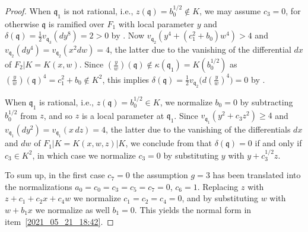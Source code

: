 \documentclass[12pt,reqno]{amsart}
\newcommand{\todoo}[2][]{\todo[size=tiny, #1]{#2}} %
\theoremstyle{definition}
\newcommand{\fq}{\mathfrak{q}}
\newcommand{\de}{\delta}
\newcommand{\ka}{\kappa}
\begin{document}
\begin{proof}
When $\fq_1$ is not rational, i.e., $z(\fq) = b_0^{1/2} \notin K$, 
we may assume $c_3 = 0$, for otherwise $\fq$ is ramified over $F_1$ with local parameter $y$ and $\de(\fq) = \frac12 v_{\fq_3}(dy^8) = 2 > 0$ by \cite[Theorem~2.3]{BedSt87}.
Now $v_{\fq_2}(y^4 + (c_1^2 + b_0) w^4)>4$ and $v_{\fq_2}(dy^4) = v_{\fq_2}(x^2 d w) = 4$, the latter due to the vanishing of the differential $dx$ of $F_2|K = K(x,w)$.
Since $(\frac{y}{w})(\fq)\notin \ka(\fq_1)=K(b_0^{1/2})$ as $(\frac{y}{w})(\fq)^4 = c_1^2 + b_0 \notin K^2$, 
this implies $\de(\fq) = \frac12 v_{\fq_2} \big( d(\frac yw)^4 \big) = 0$
by \cite[Theorem~2.3]{BedSt87}.


When $\fq_1$ is rational, i.e., $z(\fq)=b_0^{1/2} \in K$, we normalize $b_0 = 0$ by subtracting $b_0^{1/2}$ from $z$, and so $z$ is a local parameter at $\fq_1$. 
Since $v_{\fq_1}(y^2 + c_3 z^2) \geq 4$ and $v_{\fq_1}(dy^2) = v_{\fq_1}(x \, d z)=4$, the latter due to the vanishing of the differentials $dx$ and $dw$ of $F_1|K=K(x,w,z)|K$,
we conclude from \cite[Proposition~4.1]{BedSt87} that $\de(\fq)=0$ if and only if $c_3 \in K^2$, in which case we normalize $c_3=0$ by substituting $y$ with $y + c_3^{1/2} z$.

To sum up, in the first case $c_7=0$ the assumption $g=3$ has been translated into the normalizations $a_0=c_0=c_3=c_5=c_7=0$, $c_6=1$.
Replacing $z$ with $z + c_1 + c_2 x + c_4 w$ we normalize $c_1=c_2=c_4=0$, and by substituting $w$ with $w + b_1 x$ we normalize as well $b_1=0$. This yields the normal form in item~\ref{2021_05_21_18:42}.

 \medskip



\end{proof}
\end{document}
